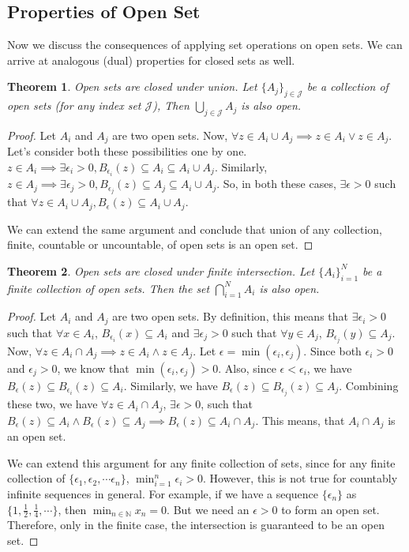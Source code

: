 \documentclass{report}
\theoremstyle{plain}
\newtheorem{theorem}{Theorem}[chapter] %
\theoremstyle{definition}
\begin{document}
\subsection{Properties of Open Set}
\noindent Now we discuss the consequences of applying set operations on open sets. We can arrive at analogous (dual) properties for closed sets as well.
\begin{theorem}
Open sets are closed under union. Let $\{A_j\}_{j\in\mathcal{J}}$ be a collection of open sets (for any index set $\mathcal{J}$), Then $\bigcup_{j\in\mathcal{J}} A_j$ is also open.
\end{theorem}
\begin{proof}
Let $A_i$ and $A_j$ are two open sets. Now, $\forall z\in A_i\cup A_j\implies z\in A_i\vee z\in A_j$. Let's consider both these possibilities one by one. $z\in A_i\implies \exists \epsilon_i>0, B_{\epsilon_i}(z)\subseteq A_i\subseteq A_i\cup A_j$. Similarly, $z\in A_j\implies \exists \epsilon_j>0, B_{\epsilon_j}(z)\subseteq A_j\subseteq A_i\cup A_j$. So, in both these cases, $\exists\epsilon>0$ such that $\forall z\in A_i\cup A_j, B_\epsilon(z)\subseteq A_i\cup A_j$.

We can extend the same argument and conclude that union of any collection, finite, countable or uncountable, of open sets is an open set.
\end{proof}
\begin{theorem}
Open sets are closed under finite intersection. Let $\{A_i\}_{i=1}^N$ be a finite collection of open sets. Then the set $\bigcap_{i=1}^N A_i$ is also open.
\end{theorem}
\begin{proof}
Let $A_i$ and $A_j$ are two open sets. By definition, this means that $\exists \epsilon_i>0$ such that $\forall x\in A_i$, $B_{\epsilon_i}(x)\subseteq A_i$ and $\exists \epsilon_j>0$ such that $\forall y\in A_j$, $B_{\epsilon_j}(y)\subseteq A_j$. Now, $\forall z\in A_i\cap A_j\implies z\in A_i\wedge z\in A_j$. Let $\epsilon=\min(\epsilon_i, \epsilon_j)$. Since both $\epsilon_i>0$ and $\epsilon_j>0$, we know that $\min(\epsilon_i, \epsilon_j)>0$. Also, since $\epsilon<\epsilon_i$, we have $B_\epsilon(z)\subseteq B_{\epsilon_i}(z)\subseteq A_i$. Similarly, we have $B_\epsilon(z)\subseteq B_{\epsilon_j}(z)\subseteq A_j$. Combining these two, we have $\forall z\in A_i\cap A_j$, $\exists\epsilon>0$, such that $B_\epsilon(z)\subseteq A_i\wedge B_\epsilon(z)\subseteq A_j\implies B_\epsilon(z)\subseteq A_i\cap A_j$. This means, that $A_i\cap A_j$ is an open set.

We can extend this argument for any finite collection of sets, since for any finite collection of $\{\epsilon_1, \epsilon_2, \cdots \epsilon_n\}$, $\min_{i=1}^n \epsilon_i > 0$. However, this is not true for countably infinite sequences in general. For example, if we have a sequence $\{\epsilon_n\}$ as $\{1,\frac{1}{2},\frac{1}{4},\cdots\}$, then $\min_{n\in\mathbb{N}} x_n = 0$. But we need an $\epsilon>0$ to form an open set. Therefore, only in the finite case, the intersection is guaranteed to be an open set.
\end{proof}
\end{document}
